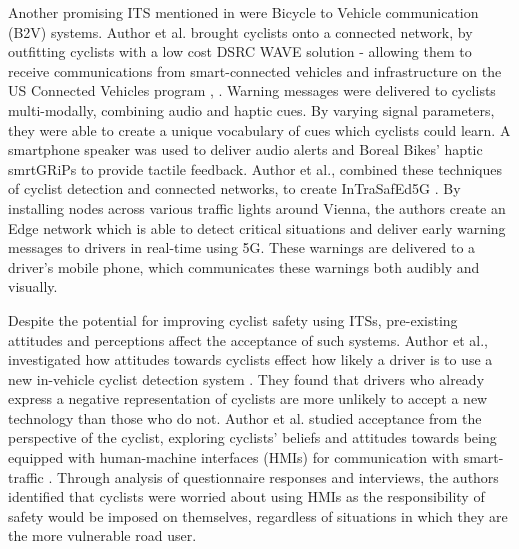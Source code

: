\documentclass{interim}
\begin{document}
Another promising ITS mentioned in \cite{SILLA2017134} were Bicycle to Vehicle communication (B2V) systems. Author et al. brought cyclists onto a connected network, by outfitting cyclists with a low cost DSRC WAVE solution - allowing them to receive communications from smart-connected vehicles and infrastructure on the US Connected Vehicles program \cite{7929602}, \cite{usdot}. Warning messages were delivered to cyclists multi-modally, combining audio and haptic cues. By varying signal parameters, they were able to create a unique vocabulary of cues which cyclists could learn. A smartphone speaker was used to deliver audio alerts and Boreal Bikes’ haptic smrtGRiPs \cite{smartgrips} to provide tactile feedback. Author et al., combined these techniques of cyclist detection and connected networks, to create InTraSafEd5G \cite{10.1145/3434770.3459732}. By installing nodes across various traffic lights around Vienna, the authors create an Edge network which is able to detect critical situations and deliver early warning messages to drivers in real-time using 5G. These warnings are delivered to a driver’s mobile phone, which communicates these warnings both audibly and visually. 

Despite the potential for improving cyclist safety using ITSs, pre-existing attitudes and perceptions affect the acceptance of such systems. Author et al., investigated how attitudes towards cyclists effect how likely a driver is to use a new in-vehicle cyclist detection system \cite{de2017negative}. They found that drivers who already express a negative representation of cyclists are more unlikely to accept a new technology than those who do not. Author et al. studied acceptance from the perspective of the cyclist, exploring cyclists’ beliefs and attitudes towards being equipped with human-machine interfaces (HMIs) for communication with smart-traffic \cite{berge2022cyclists}. Through analysis of questionnaire responses and interviews, the authors identified that cyclists were worried about using HMIs as the responsibility of safety would be imposed on themselves, regardless of situations in which they are the more vulnerable road user. 
\end{document}
